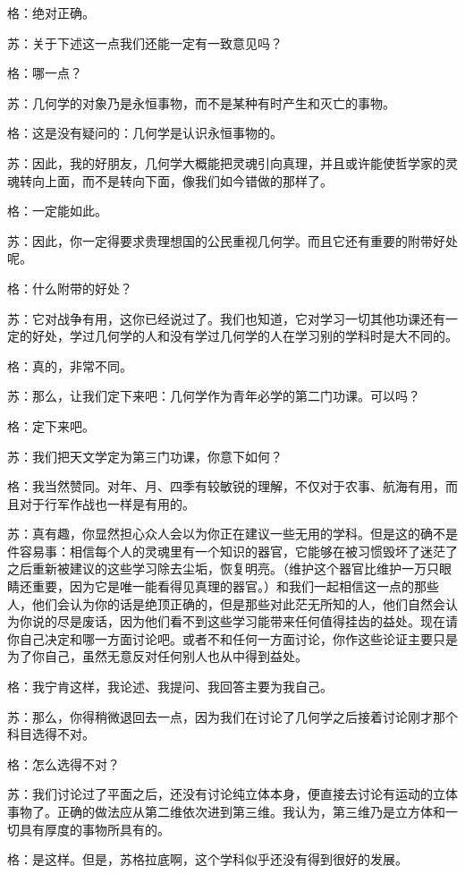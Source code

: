 \documentclass[12pt,oneside]{book}
\begin{document}
格：绝对正确。

苏：关于下述这一点我们还能一定有一致意见吗？

格：哪一点？

苏：几何学的对象乃是永恒事物，而不是某种有时产生和灭亡的事物。

格：这是没有疑问的：几何学是认识永恒事物的。

苏：因此，我的好朋友，几何学大概能把灵魂引向真理，并且或许能使哲学家的灵魂转向上面，而不是转向下面，像我们如今错做的那样了。

格：一定能如此。

苏：因此，你一定得要求贵理想国的公民重视几何学。而且它还有重要的附带好处呢。

格：什么附带的好处？

苏：它对战争有用，这你已经说过了。我们也知道，它对学习一切其他功课还有一定的好处，学过几何学的人和没有学过几何学的人在学习别的学科时是大不同的。

格：真的，非常不同。

苏：那么，让我们定下来吧：几何学作为青年必学的第二门功课。可以吗？

格：定下来吧。

苏：我们把天文学定为第三门功课，你意下如何？

格：我当然赞同。对年、月、四季有较敏锐的理解，不仅对于农事、航海有用，而且对于行军作战也一样是有用的。

苏：真有趣，你显然担心众人会以为你正在建议一些无用的学科。但是这的确不是件容易事：相信每个人的灵魂里有一个知识的器官，它能够在被习惯毁坏了迷茫了之后重新被建议的这些学习除去尘垢，恢复明亮。（维护这个器官比维护一万只眼睛还重要，因为它是唯一能看得见真理的器官。）和我们一起相信这一点的那些人，他们会认为你的话是绝顶正确的，但是那些对此茫无所知的人，他们自然会认为你说的尽是废话，因为他们看不到这些学习能带来任何值得挂齿的益处。现在请你自己决定和哪一方面讨论吧。或者不和任何一方面讨论，你作这些论证主要只是为了你自己，虽然无意反对任何别人也从中得到益处。

格：我宁肯这样，我论述、我提问、我回答主要为我自己。

苏：那么，你得稍微退回去一点，因为我们在讨论了几何学之后接着讨论刚才那个科目选得不对。

格：怎么选得不对？

苏：我们讨论过了平面之后，还没有讨论纯立体本身，便直接去讨论有运动的立体事物了。正确的做法应从第二维依次进到第三维。我认为，第三维乃是立方体和一切具有厚度的事物所具有的。

格：是这样。但是，苏格拉底啊，这个学科似乎还没有得到很好的发展。
\end{document}
